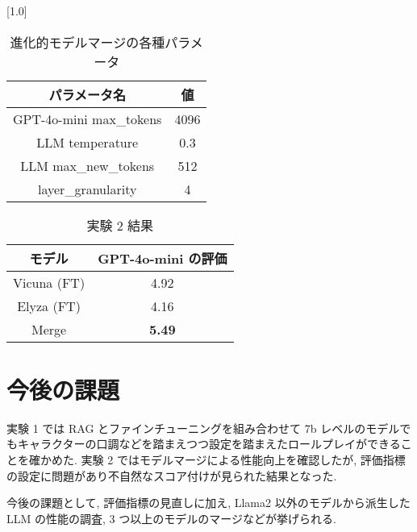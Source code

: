 \documentclass[twocolumn]{jarticle}
\begin{document}
  \begin{table}[t]
    \small
    \centering
    \caption{進化的モデルマージの各種パラメータ}
    \vspace{-0.3cm}
    \label{table:mergepram}
    \scalebox{1.0}[1.0]{
      \begin{tabular}{|c|c|}
        \hline
        パラメータ名 & 値 \\ \hline \hline
        GPT-4o-mini max\_tokens & 4096 \\ \hline     
        LLM temperature &   0.3  \\ \hline
        LLM max\_new\_tokens            & 512     \\ \hline
        layer\_granularity              & 4 \\ \hline
        \end{tabular}
    }
    \end{table}

\begin{table}[t]
\small
\centering
\caption{実験 2 結果}
\vspace{-0.3cm}
\label{table:result2}
\begin{tabular}{|c|c|}
\hline
モデル         & GPT-4o-mini の評価 \\ \hline
Vicuna (FT) & 4.92            \\ \hline
Elyza (FT)  & 4.16            \\ \hline
Merge       & \textbf{5.49}            \\ \hline
\end{tabular}
\end{table}




\section{今後の課題}
実験 1 では RAG とファインチューニングを組み合わせて 7b レベルのモデルでもキャラクターの口調などを踏まえつつ設定を踏まえたロールプレイができることを確かめた. 実験 2 ではモデルマージによる性能向上を確認したが, 評価指標の設定に問題があり不自然なスコア付けが見られた結果となった. \par
今後の課題として, 評価指標の見直しに加え, Llama2 以外のモデルから派生した LLM の性能の調査, 3 つ以上のモデルのマージなどが挙げられる.




\end{document}
